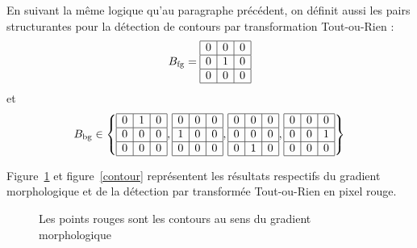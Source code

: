 \documentclass[10pt,a4paper]{article}
\begin{document}
{En suivant la m\^{e}me logique qu'au paragraphe pr\'{e}c\'{e}dent, on d\'{e}finit aussi les pairs structurantes pour la d\'{e}tection de contours par transformation Tout-ou-Rien : 
\begin{displaymath}
B_{\text{fg}} = 
\begin{array}{|c|c|c|}
	\hline 0  & 0  & 0   \\
	\hline 0  & 1  & 0  \\
	\hline 0  & 0  & 0  \\
	\hline
\end{array}
\end{displaymath}
et
\begin{displaymath}
B_{\text{bg}} \in\left\{ 
	\begin{array}{|c|c|c|}
	 \hline 0  & 1  & 0   \\
	 \hline 0  & 0  & 0  \\
	 \hline 0  & 0  & 0  \\
	\hline
	\end{array},
	\begin{array}{|c|c|c|}
	 \hline 0  & 0  & 0   \\
	 \hline 1  & 0  & 0  \\
	 \hline 0  & 0  & 0  \\
	\hline
	\end{array},
	\begin{array}{|c|c|c|}
	 \hline 0  & 0  & 0   \\
	 \hline 0  & 0  & 0  \\
	 \hline 0  & 1  & 0  \\
	\hline
	\end{array},
	\begin{array}{|c|c|c|}
	 \hline 0  & 0  & 0   \\
	 \hline 0  & 0  & 1  \\
	 \hline 0  & 0  & 0  \\
	\hline
	\end{array}
\right\}
\end{displaymath}

Figure~\ref{gradient} et figure~\ref{contour} repr\'{e}sentent les r\'{e}sultats respectifs du gradient morphologique et de la d\'{e}tection par transform\'{e}e Tout-ou-Rien en pixel rouge.

\begin{figure}[h]
\hspace{-0.0\textwidth}\scalebox{0.66}{}
\vspace{-10mm}
	\caption{Les points rouges sont les contours au sens du gradient morphologique}
	\label{gradient}
\end{figure}

}
\end{document}

